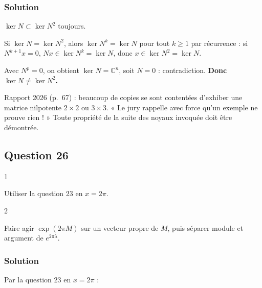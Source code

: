 \documentclass[11pt,a4paper]{article}
\newcommand{\equationajustee}[1]{%
  \sbox{\boiteequation}{$\displaystyle #1$}%
  \ifdim\wd\boiteequation>\linewidth
    \[\resizebox{\linewidth}{!}{\usebox{\boiteequation}}\]%
  \else
    \[#1\]%
  \fi}
\begin{document}
\hypertarget{solution-24}{%
\subsubsection{Solution}\label{solution-24}}

\(\ker N\subset\ker N^2\) toujours.

Si \(\ker N=\ker N^2\), alors \(\ker N^k=\ker N\) pour tout \(k\ge1\) par récurrence : si \(N^{k+1}x=0\), \(Nx\in\ker N^k=\ker N\), donc \(x\in\ker N^2=\ker N\).

Avec \(N^p=0\), on obtient \(\ker N={\mathbb{C}}^n\), soit \(N=0\) : contradiction. \textbf{Donc \(\ker N\neq\ker N^2\).}

\begin{jury}

Rapport 2026 (p.~67) : beaucoup de copies se sont contentées d'exhiber une matrice nilpotente \(2\times2\) ou \(3\times3\). « Le jury rappelle avec force qu'un exemple ne prouve rien ! » Toute propriété de la suite des noyaux invoquée doit être démontrée.

\end{jury}

\hypertarget{question-26}{%
\subsection{Question 26}\label{question-26}}

\begin{indication}{1}

Utiliser la question 23 en \(x=2\pi\).

\end{indication}

\begin{indication}{2}

Faire agir \(\exp(2\pi M)\) sur un vecteur propre de \(M\), puis séparer module et argument de \(e^{2\pi\lambda}\).

\end{indication}

\hypertarget{solution-25}{%
\subsubsection{Solution}\label{solution-25}}

Par la question 23 en \(x=2\pi\) :

\equationajustee{\begin{aligned}\exp(2\pi M)&=\Psi(2\pi)\\&=\varphi(1)=I_n.\end{aligned}}
\end{document}
